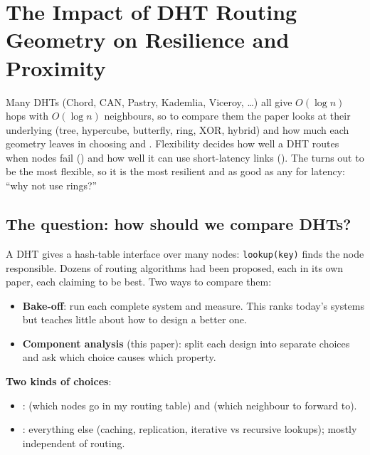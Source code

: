 \chapter{The Impact of DHT Routing Geometry on Resilience and Proximity}

\begin{keybox}
Many DHTs (Chord, CAN, Pastry, Kademlia, Viceroy, \dots) all give $O(\log n)$ hops with $O(\log n)$ neighbours, so to compare them the paper looks
at their underlying  (tree, hypercube, butterfly, ring, XOR, hybrid) and how much  each geometry
leaves in choosing  and . Flexibility decides how well a DHT routes when nodes fail () and how well it can use short-latency links (). The  turns out to be the most flexible, so it is the most
resilient and as good as any for latency: ``why not use rings?''
\end{keybox}

\section{The question: how should we compare DHTs?}

A DHT gives a hash-table interface over many nodes: \texttt{lookup(key)} finds the node responsible. Dozens of routing algorithms had been
proposed, each in its own paper, each claiming to be best. Two ways to compare them:
\begin{itemize}
  \item \textbf{Bake-off}: run each complete system and measure. This ranks today's systems but teaches little about how to design a better one.
  \item \textbf{Component analysis} (this paper): split each design into separate choices and ask which choice causes which property.
\end{itemize}

\textbf{Two kinds of choices}:
\begin{itemize}
  \item {}:  (which nodes go in my routing table) and  (which neighbour to forward to).
  \item {}: everything else (caching, replication, iterative vs recursive lookups); mostly independent of routing.
\end{itemize}

